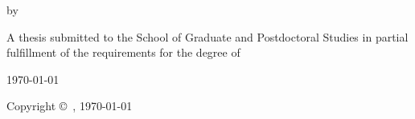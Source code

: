 
\begin{titlepage}
\begin{center}
    \vspace*{1.5cm}

    {\LARGE\bfseries \ttitle \par}

    \vspace{2cm}

    {\large by \par}
    \vspace{0.5cm}
    {\Large \authorname \par}

    \vspace{2cm}

    A thesis submitted to the School of Graduate and Postdoctoral Studies in partial
    fulfillment of the requirements for the degree of

    \vspace{0.5cm}
    {\large \degreename \par}

    \vspace{1.5cm}
    {\large \facname \par}
    {\large \univname \par}
    {\large \universitybrand \par}
    {\large \addressname \par}

    \vfill

    {\large \monthyeardate\today \par}

    \vspace{0.75cm}
    {\small Copyright \copyright\ \authorname, \yeardate\today \par}
\end{center}
\end{titlepage}
